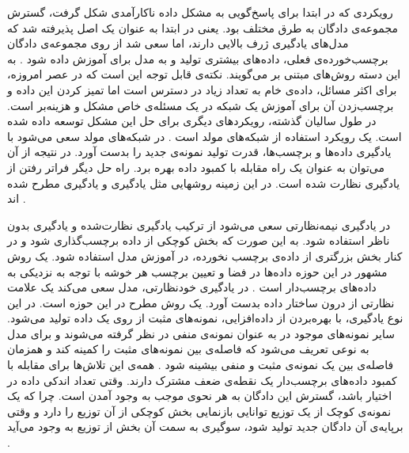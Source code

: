   رویکردی که در ابتدا برای پاسخ‌گویی به مشکل داده ناکارآمدی شکل گرفت، گسترش مجموعه‌ی دادگان به طرق مختلف بود. یعنی در ابتدا به عنوان یک اصل پذیرفته شد که مدل‌های یادگیری ژرف 
  بالایی دارند، اما سعی شد از روی مجموعه‌ی دادگان برچسب‌خورده‌ی فعلی، داده‌های بیشتری تولید و به مدل برای آموزش داده شود
  \cite{Shorten2019ASO}
  .
  به این دسته روش‌های مبتنی بر 
  می‌گویند. نکته‌ی قابل توجه این است که در عصر امروزه، برای اکثر مسائل، داده‌ی خام به تعداد زیاد در دسترس است اما تمیز کردن این داده و برچسب‌زدن آن برای آموزش یک شبکه در یک مسئله‌ی خاص مشکل و هزینه‌بر است. در طول سالیان گذشته، رویکردهای دیگری برای حل این مشکل توسعه داده شده است. یک رویکرد استفاده از شبکه‌های مولد است
  \cite{Wang2018LowShotLF,Hariharan2016LowShotVR}
  .
   در شبکه‌های مولد سعی می‌شود با یادگیری
    داده‌ها و برچسب‌ها، قدرت تولید نمونه‌ی جدید را بدست آورد. در نتیجه از آن می‌توان به
  عنوان یک راه مقابله با کمبود داده بهره برد. راه حل دیگر فراتر رفتن از یادگیری نظارت شده است. در این زمینه روشهایی مثل یادگیری
  و یادگیری
   مطرح شده اند
   \cite{Jing2019SelfSupervisedVF,Liu2020SelfSupervisedLG,Reddy2018SemisupervisedLA,Kingma2014SemisupervisedLW}
   .
   
   در یادگیری نیمه‌نظارتی سعی می‌شود از ترکیب یادگیری نظارت‌شده و یادگیری بدون
   ناظر استفاده شود. به این صورت که بخش کوچکی از داده برچسب‌گذاری شود و در کنار بخش بزرگتری از داده‌ی برچسب نخورده، در آموزش مدل  استفاده شود. یک روش مشهور در این حوزه
    داده‌ها در فضا و تعیین برچسب هر خوشه با توجه به نزدیکی به داده‌های برچسب‌دار است
    \cite{Bair2013SemisupervisedCM,Qin2019ResearchPO}
    .
   در یادگیری خودنظارتی، مدل سعی می‌کند یک علامت نظارتی از درون ساختار داده بدست آورد. یک روش مطرح در این حوزه
    است. در این نوع یادگیری، با بهره‌بردن از داده‌افزایی، نمونه‌های مثبت از روی یک داده تولید می‌شود. سایر نمونه‌های موجود در
     به عنوان نمونه‌ی منفی در نظر گرفته می‌شوند و
      برای مدل به نوعی تعریف می‌شود که فاصله‌ی بین نمونه‌های مثبت را کمینه کند و همزمان فاصله‌ی بین یک نمونه‌ی مثبت و منفی بیشینه شود
    \cite{Chen2020BigSM,Chen2020ASF}
    .
    همه‌ی این تلاش‌ها برای مقابله با کمبود داده‌های برچسب‌دار یک نقطه‌ی ضعف مشترک دارند. وقتی تعداد اندکی داده در اختیار باشد، گسترش این دادگان به هر نحوی موجب به وجود آمدن
     است. چرا که یک نمونه‌ی کوچک از یک توزیع توانایی بازنمایی بخش کوچکی از آن توزیع را دارد و وقتی برپایه‌ی آن دادگان جدید تولید شود، سوگیری به سمت آن بخش از توزیع به وجود می‌آید
     \cite{Yang2021FreeLF}
     .
  
